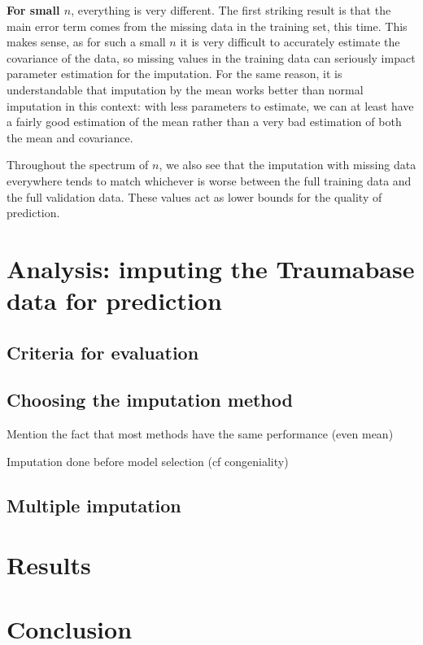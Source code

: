 \documentclass[12pt, a4paper]{memoir}
\begin{document}
\textbf{For small $n$}, everything is very different. The first striking result is that the main error term comes from the missing data in the training set, this time. This makes sense, as for such a small $n$ it is very difficult to accurately estimate the covariance of the data, so missing values in the training data can seriously impact parameter estimation for the imputation. For the same reason, it is understandable that imputation by the mean works better than normal imputation in this context: with less parameters to estimate, we can at least have a fairly good estimation of the mean rather than a very bad estimation of both the mean and covariance. 

Throughout the spectrum of $n$, we also see that the imputation with missing data everywhere tends to match whichever is worse between the full training data and the full validation data. These values act as lower bounds for the quality of prediction. 

\chapter{Analysis: imputing the Traumabase data for prediction}
\label{analysis}
	\section{Criteria for evaluation}
	\section{Choosing the imputation method}
		Mention the fact that most methods have the same performance (even mean)
		
		Imputation done before model selection (cf congeniality)
	\section{Multiple imputation}
	
\chapter{Results}
\label{results}

\chapter*{Conclusion}


\end{document}
